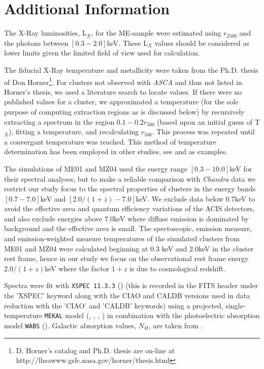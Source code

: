 \documentclass[preprint]{aastex}
\begin{document}
\section{Additional Information}

The X-Ray luminosities, L$_X$,
for the ME-sample were estimated using $r_{2500}$ 
and the photons between $[0.3-2.0]$keV. These L$_X$ values
should be considered as lower limits given the limited field of view
used for calculation.

The fiducial X-Ray temperature and metallicity were taken from the Ph.D. thesis of
Don Horner\footnote{D. Horner's catalog and Ph.D. thesis are on-line at
http://lheawww.gsfc.nasa.gov/horner/thesis.html}. For clusters not
observed with {\textit{ASCA}} and thus not listed in Horner's thesis,
we used a literature search to locate values. If there were no
published values for a cluster, we approximated a temperature (for the sole purpose of
computing extraction regions as is discussed below)
by recursively extracting a spectrum in the region $0.1-0.2r_{500}$
(based upon an initial guess of T$_{X}$), fitting a temperature, and
recalculating $r_{500}$. This process was repeated until a convergant
temperature was reached. This method of temperature determination has
been employed in other studies, see \cite{2006MNRAS.tmp.1068S} and
\cite{2006ApJS..162..304H} as examples.

The simulations of ME01 and MZ04 used the energy range $[0.3-10.0]$keV
for their spectral analyses, but to make a reliable comparison with
{\textit{Chandra}} data we restrict our study focus to the spectral properties of
clusters in the energy bands $[0.7-7.0]$keV and
$[2.0/(1+z)-7.0]$keV. We exclude data below $0.7$keV to avoid the
effective area and quantum efficiency variations of the ACIS detectors, and
also exclude energies above $7.0$keV where diffuse emission is
dominated by background and the effective area is small. The spectoscopic, emission measure, and
emission-weighted measure temperatures of the simulated
clusters from ME01 and MZ04 were calculated beginning at $0.3$ keV and
$2.0$keV in the cluster rest frame, hence in our study we focus on the observational
rest frame energy $2.0/(1+z)$keV where the factor $1+z$ is due
to cosmological redshift.

Spectra were fit with {\tt XSPEC 11.3.3} (\cite{1996ASPC..101...17A}) (this is recorded in the FITS
header under the 'XSPEC' keyword along with the CIAO and CALDB
versions used in data reduction with the 'CIAO' and 'CALDB' keywords)
using a projected, single-temperature {\tt MEKAL} model
(\cite{1985A&AS...62..197M}, \cite{1986A&AS...65..511M},
\cite{1992SRON}, \cite{1995ApJ...438L.115L})
in combination with the photoelectric
absorption model {\tt WABS} (\cite{1983ApJ...270..119M}). Galactic
absorption values, $N_{H}$, are taken from
\cite{1990ARA&A..28..215D}.
\end{document}
